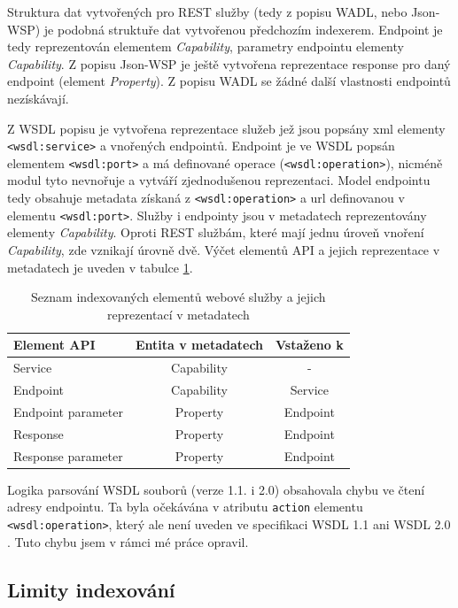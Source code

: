 \documentclass[czech,DP]{thesiskiv}
\begin{document}
Struktura dat vytvořených pro REST služby (tedy z popisu WADL, nebo Json-WSP) je podobná struktuře dat vytvořenou předchozím indexerem. Endpoint je tedy reprezentován elementem \textit{Capability}, parametry endpointu elementy \textit{Capability}. Z popisu Json-WSP je ještě vytvořena reprezentace response pro daný endpoint (element \textit{Property}). Z popisu WADL se žádné další vlastnosti endpointů nezískávají.

Z WSDL popisu je vytvořena reprezentace služeb jež jsou popsány xml elementy \verb|<wsdl:service>| a vnořených endpointů. Endpoint je ve WSDL popsán elementem \verb|<wsdl:port>| a má definované operace (\verb|<wsdl:operation>|), nicméně modul tyto nevnořuje a vytváří zjednodušenou reprezentaci. Model endpointu tedy obsahuje metadata získaná z \verb|<wsdl:operation>| a url definovanou v elementu \verb|<wsdl:port>|. Služby i endpointy jsou v metadatech reprezentovány elementy \textit{Capability}. Oproti REST službám, které mají jednu úroveň vnoření \textit{Capability}, zde vznikají úrovně dvě. Výčet elementů API a jejich reprezentace v metadatech je uveden v tabulce \ref{tab:ws-indexed}.

\begin{table}[h]
	\centering
	\begin{tabular}{|l | c | c |}
		\hline
		Element API & Entita v metadatech & Vstaženo k \\
		\hline
		\hline
		Service & Capability & - \\
		\hline
		Endpoint & Capability & Service \\
		\hline
		Endpoint parameter & Property & Endpoint \\
		\hline
		Response & Property & Endpoint \\
		\hline
		Response parameter & Property & Endpoint \\
		\hline
	\end{tabular}
	\caption{Seznam indexovaných elementů webové služby a jejich reprezentací v metadatech}
	\label{tab:ws-indexed}
\end{table}

Logika parsování WSDL souborů (verze 1.1. i 2.0) obsahovala chybu ve čtení adresy endpointu. Ta byla očekávána v atributu \verb|action| elementu \verb|<wsdl:operation>|, který ale není uveden ve specifikaci WSDL 1.1 \cite{wsdl1} ani WSDL 2.0 \cite{wsdl2}. Tuto chybu jsem v rámci mé práce opravil.

\subsection{Limity indexování}
\end{document}

